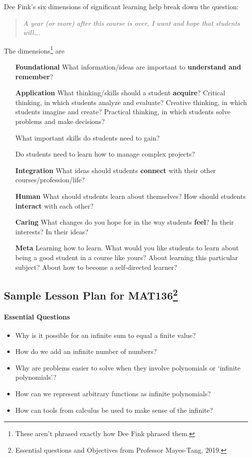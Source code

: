 \documentclass{book}
\begin{document}
Dee Fink's six dimensions of significant learning help break down the question:
\begin{quote}
	\emph{
		A year (or more) after this course is over, I want and hope that students will\ldots.}
\end{quote}

The dimensions\footnote{These aren't phrased exactly how Dee Fink phrased them.} are
\begin{itemize}
	\item[\textbf{Foundational}] What information/ideas are important to \textbf{understand and remember}? 
	\item[\textbf{Application}] What thinking/skills should a student \textbf{acquire}?
		Critical thinking, in which students analyze and evaluate? Creative thinking, in which students imagine and create?
		Practical thinking, in which students solve problems and make decisions?

		What important skills do students need to gain?

		Do students need to learn how to manage complex projects?

	\item[\textbf{Integration}] What ideas should students \textbf{connect} with their other courses/profession/life?

	\item[\textbf{Human}] What should students learn about themselves? How should students \textbf{interact} with each other? 

	\item[\textbf{Caring}] What changes do you hope for in the way students \textbf{feel}? In their interests? In their ideas?

	\item[\textbf{Meta}] Learning how to learn. What would you like students to learn about being a good student in a course like yours?
		About learning this particular subject? About how to become a self-directed learner?
\end{itemize}

\newpage
\subsection*{Sample Lesson Plan for MAT136\footnote{Essential questions and Objectives from Professor Mayes-Tang, 2019.}}

\paragraph{Essential Questions}
\begin{itemize}
	\item	Why is it possible for an infinite sum to equal a finite value?
	\item How do we add an infinite number of numbers?
	\item Why are problems easier to solve when they involve polynomials or
`infinite polynomials'?
	\item How can we represent arbitrary functions as infinite polynomials?
	\item How can tools from calculus be used to make sense of the infinite?
\end{itemize}
\end{document}
